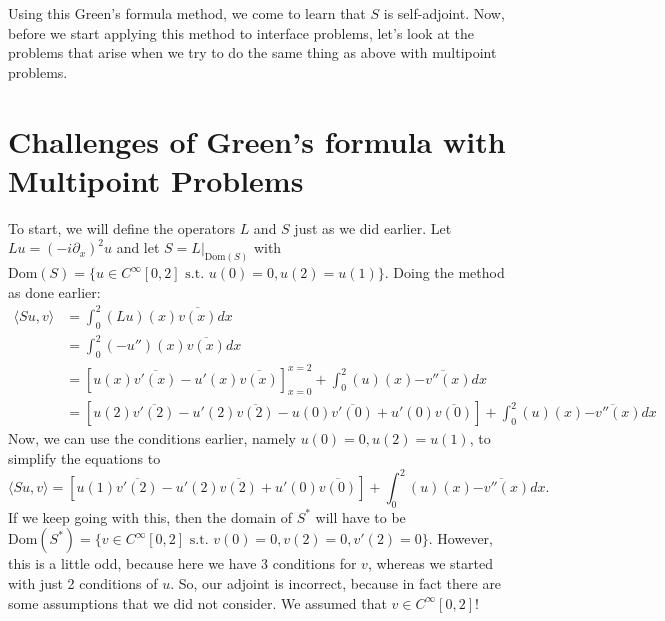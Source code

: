 \documentclass[11pt,reqno,oneside,a4paper]{article}
\begin{document}
Using this Green's formula method, we come to learn that $S$ is self-adjoint. Now, before we start applying this method to interface problems, let's look at the problems that arise when we try to do the same thing as above with multipoint problems.





\section*{Challenges of Green's formula with Multipoint Problems}
To start, we will define the operators $L$ and $S$ just as we did earlier. Let $Lu = (-i\partial_x)^2u$ and let $S = L|_{\text{Dom}(S)}$ with
$\text{Dom}(S) = \{u\in C^\infty[0,2] \text{ s.t. } u(0) = 0, u(2) = u(1)\}$. Doing the method as done earlier:
\begin{align*}
\langle Su,v \rangle &= \int_{0}^{2}(Lu)(x)\overline{v(x)}dx \\
&= \int_{0}^{2}(-u'')(x)\overline{v(x)}dx \\
&= \left[u(x)\overline{v'(x)} - u'(x)\overline{v(x)}\right]_{x = 0}^{x=2} + \int_{0}^{2}(u)(x)\overline{-v''(x)}dx\\
&= \left[u(2)\overline{v'(2)} - u'(2)\overline{v(2)} -u(0)\overline{v'(0)} + u'(0)\overline{v(0)}\right] + \int_{0}^{2}(u)(x)\overline{-v''(x)}dx
\end{align*}
Now, we can use the conditions earlier, namely $u(0) = 0, u(2) = u(1)$, to simplify the equations to 
$$ \langle Su,v \rangle = \left[u(1)\overline{v'(2)} - u'(2)\overline{v(2)} + u'(0)\overline{v(0)}\right] + \int_{0}^{2}(u)(x)\overline{-v''(x)}dx.$$ If we keep going with this, then the domain of $S^*$ will have to be $\text{Dom}(S^*) = \{v\in C^\infty[0,2] \text{ s.t. } v(0) = 0, v(2) = 0, v'(2) = 0\}$. However, this is a little odd, because here we have 3 conditions for $v$, whereas we started with just 2 conditions of $u$. So, our adjoint is incorrect, because in fact there are some assumptions that we did not consider. We assumed that $v\in C^\infty[0,2]$! 
\end{document}
